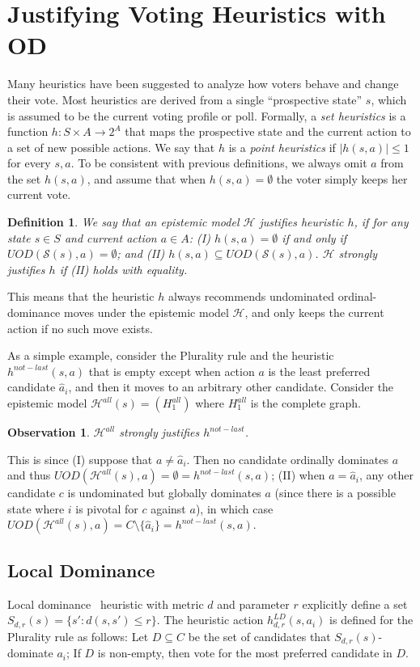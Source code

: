 \documentclass[letterpaper]{article} %
\def\calS{\mathcal{S}}
\def\calH{\mathcal{H}}
\newtheorem{definition}{Definition}
\newtheorem{observation}[theorem]{Observation}
\begin{document}
\section{Justifying Voting Heuristics with OD}\label{sec:heuristics}

Many heuristics have been suggested to analyze how voters behave and change their vote.
Most heuristics are derived from a single ``prospective state'' $s$, which is assumed to be the current voting profile or poll. Formally, a \emph{set heuristics} is a function $h:S\times A \rightarrow 2^A$ that maps the prospective state and the current action to a set of new possible actions. We say that $h$ is a \emph{point heuristics} if $|h(s,a)|\leq 1$ for every $s,a$. To be consistent with previous definitions, we always omit $a$ from the set $h(s,a)$, and assume that when $h(s,a)=\emptyset$ the voter simply keeps her current vote.

\begin{definition} We say that an epistemic model $\calH$ \emph{justifies} heuristic $h$,
if for any state $s\in S$ and current action $a\in A$:
 (I) $h(s,a)=\emptyset$ if and only if $UOD(\calS(s),a)=\emptyset$; and (II) $h(s,a)\subseteq UOD(\calS(s),a)$.
$\calH$ \emph{strongly justifies} $h$ if (II) holds with equality.
\end{definition}
This means that the heuristic $h$ always recommends undominated ordinal-dominance moves under the epistemic model $\calH$, and only keeps the current action if no such move exists.

As a simple example, consider the Plurality rule and the heuristic $h^{not-last}(s,a)$ that is empty except when action $a$ is the least preferred candidate $\hat a_i$, and then it moves to an arbitrary other candidate.
Consider the epistemic model $\calH^{all}(s) = (H^{all}_1)$ where $H^{all}_1$ is the complete graph.

\begin{observation} $\calH^{all}$ strongly justifies $h^{not-last}$.
\end{observation}
This is since (I) suppose that $a\neq \hat a_i$. Then no candidate ordinally dominates $a$ and thus $UOD(\calH^{all}(s),a)=\emptyset=h^{not-last}(s,a)$; (II) when $a=\hat a_i$, any other candidate $c$ is undominated but globally dominates $a$ (since there is a possible state where $i$ is pivotal for $c$ against $a$), in which case $UOD(\calH^{all}(s),a)=C\setminus\{\hat a_i\}=h^{not-last}(s,a)$.


\subsection{Local Dominance}\label{sec:h_LD}
Local dominance~\cite{MLR14} heuristic with metric $d$ and parameter $r$ explicitly define a set $S_{d,r}(s)=\{s' : d(s,s')\leq r\}$. The heuristic action $h^{LD}_{d,r}(s,a_i)$ is defined for the Plurality rule as follows: Let $D\subseteq C$ be the set of candidates that $S_{d,r}(s)$-dominate $a_i$; If $D$ is non-empty, then vote for the most preferred candidate in $D$.
\end{document}

